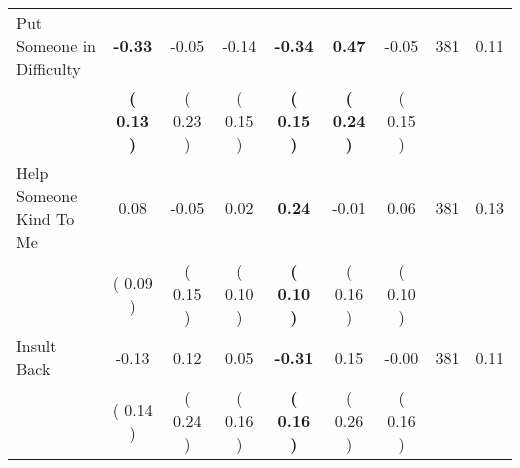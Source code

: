 \begin{tabular}{lcccccccc}
Put Someone in Difficulty & \textbf{    -0.33} &     -0.05 &     -0.14 & \textbf{    -0.34} & \textbf{     0.47} &     -0.05 & 381 &       0.11 \\ 
 & \textbf{(     0.13 )} & (     0.23 ) & (     0.15 ) & \textbf{(     0.15 )} & \textbf{(     0.24 )} & (     0.15 ) & \\
Help Someone Kind To Me &      0.08 &     -0.05 &      0.02 & \textbf{     0.24} &     -0.01 &      0.06 & 381 &       0.13 \\ 
 & (     0.09 ) & (     0.15 ) & (     0.10 ) & \textbf{(     0.10 )} & (     0.16 ) & (     0.10 ) & \\
Insult Back &     -0.13 &      0.12 &      0.05 & \textbf{    -0.31} &      0.15 &     -0.00 & 381 &       0.11 \\ 
 & (     0.14 ) & (     0.24 ) & (     0.16 ) & \textbf{(     0.16 )} & (     0.26 ) & (     0.16 ) & \\
\bottomrule
\end{tabular}
